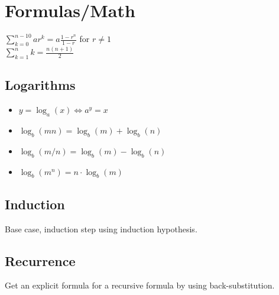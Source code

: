\section{Formulas/Math}
$\sum_{k=0}^{n-10}ar^{k}=a\frac{1-r^n}{1-r}$ for $r\neq 1$
\\$\sum_{k=1}^{n}k=\frac{n(n+1)}{2}$
\subsection{Logarithms}
\begin{itemize}
	\item $y=\log_a{(x)}\iff a^y=x$
	\item $\log_b{(mn)}=\log_b{(m)}+\log_b{(n)}$
	\item $\log_b{(m/n)}=\log_b{(m)}-\log_b{(n)}$
	\item $\log_b{(m^n)}=n \cdot \log_b{(m)}$
\end{itemize}
\subsection{Induction} Base case, induction step using induction hypothesis.
\subsection{Recurrence} Get an explicit formula for a recursive formula by using back-substitution.
